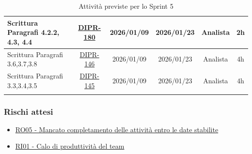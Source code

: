 \documentclass[a4paper,12pt]{article}
\begin{document}
\begin{longtable}{|p{4cm}|c|c|c|c|c|}
    \hline
    Scrittura Paragrafi 4.2.2, 4.3, 4.4 & \href{https://7zpus.atlassian.net/browse/DIPR-180}{DIPR-180} & 2026/01/09 & 2026/01/23 & Analista & 2h \\
    \hline
    Scrittura Paragrafi 3.6,3.7,3.8& \href{https://7zpus.atlassian.net/browse/DIPR-146}{DIPR-146} & 2026/01/09 & 2026/01/23 & Analista & 4h \\
    \hline
    Scrittura Paragrafi 3.3,3.4,3.5 & \href{https://7zpus.atlassian.net/browse/DIPR-145}{DIPR-145} & 2026/01/09 & 2026/01/23 & Analista & 4h \\
    \hline
    \rowcolor{white}
    \caption{Attività previste per lo Sprint 5}

\end{longtable}

\subsubsection{Rischi attesi}
\begin{itemize}
    \item \hyperref[RO05]{RO05 - Mancato completamento delle attività entro le date stabilite}
    \item \hyperref[RI01]{RI01 - Calo di produttività del team}
\end{itemize}
\end{document}
